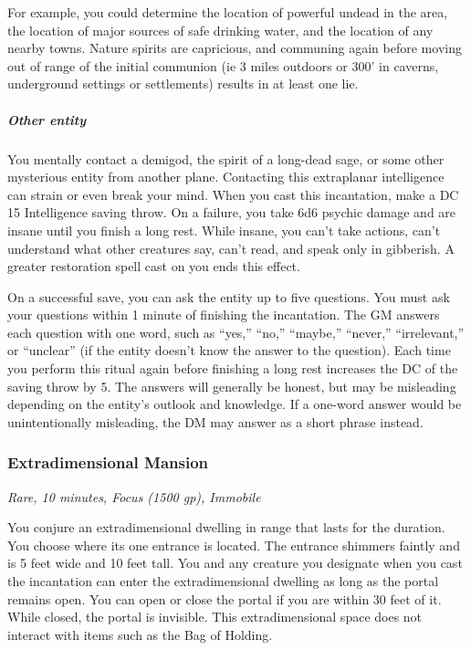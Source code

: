 For example, you could determine the location of powerful undead in the area, the location of major sources of safe drinking water, and the location of any nearby towns.
Nature spirits are capricious, and communing again before moving out of range of the initial communion (ie 3 miles outdoors or 300' in caverns, underground settings or settlements) results in at least one lie.

\subparagraph*{Other entity} You mentally contact a demigod, the spirit of a long-dead sage, or some other mysterious entity from another plane. Contacting this extraplanar intelligence can strain or even break your mind. When you cast this incantation, make a DC 15 Intelligence saving throw. On a failure, you take 6d6 psychic damage and are insane until you finish a long rest. While insane, you can't take actions, can't understand what other creatures say, can't read, and speak only in gibberish. A greater restoration spell cast on you ends this effect.

On a successful save, you can ask the entity up to five questions. You must ask your questions within 1 minute of finishing the incantation. The GM answers each question with one word, such as “yes,” “no,” “maybe,” “never,” “irrelevant,” or “unclear” (if the entity doesn't know the answer to the question).  Each time you perform this ritual again before finishing a long rest increases the DC of the saving throw by 5. The answers will generally be honest, but may be misleading depending on the entity's outlook and knowledge. If a one-word answer would be unintentionally misleading, the DM may answer as a short phrase instead.

\subsubsection{Extradimensional Mansion}
\textit{Rare, 10 minutes, Focus (1500 gp), Immobile}

You conjure an extradimensional dwelling in range that lasts for the duration. You choose where its one entrance is located. The entrance shimmers faintly and is 5 feet wide and 10 feet tall. You and any creature you designate when you cast the incantation can enter the extradimensional dwelling as long as the portal remains open. You can open or close the portal if you are within 30 feet of it. While closed, the portal is invisible. This extradimensional space does not interact with items such as the Bag of Holding.

